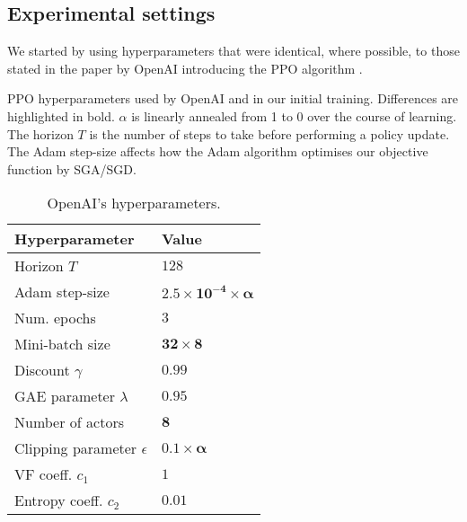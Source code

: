 \documentclass[12pt,a4paper]{article}
\begin{document}
\subsection{Experimental settings}
We started by using hyperparameters that were identical, where possible, to those stated in the paper by OpenAI introducing the PPO algorithm \cite{DBLP:journals/corr/SchulmanWDRK17}. 

\begin{table}[ht]
    \caption{PPO hyperparameters used by OpenAI and in our initial training. Differences are highlighted in bold. $\alpha$ is linearly annealed from 1 to 0 over the course of learning. The horizon $T$ is the number of steps to take before performing a policy update. The Adam step-size affects how the Adam algorithm optimises our objective function by SGA/SGD.}
    \label{tab:temps}
    \begin{subtable}[ht]{0.45\textwidth}
        \centering
        \caption{OpenAI's hyperparameters.}
        \label{tab:openai-param}    
        \begin{tabular}{ l|l } 
            Hyperparameter                & Value \\
            \hline 
            Horizon $T$                   & $128$ \\ 
            Adam step-size                 & $\mathbf{2.5 \times 10^{-4} \times \alpha}$ \\
            Num. epochs                   & $3$ \\
            Mini-batch size                & $\mathbf{32 \times 8}$ \\
            Discount $\gamma$           & $0.99$ \\
            GAE parameter $\lambda$     & $0.95$ \\
            Number of actors              & $\mathbf{8}$ \\
            Clipping parameter $\epsilon$ & $\mathbf{0.1 \times \alpha}$ \\
            VF coeff. $c_1$               & $1$ \\
            Entropy coeff. $c_2$          & $\mathbf{0.01}$
        \end{tabular}
       

\end{subtable}
\end{table}
\end{document}
